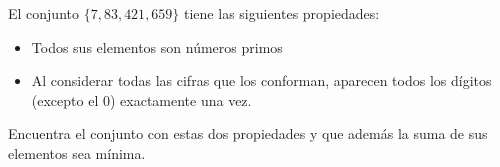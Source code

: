 El conjunto $\{7,83,421,659\}$ tiene las siguientes propiedades:
 \begin{itemize} 
 \item  Todos sus elementos son números primos 
 \item  Al considerar todas las cifras que los conforman, aparecen todos los dígitos (excepto el $0$) exactamente una vez. 
 \end{itemize} 
Encuentra el conjunto con estas dos propiedades y que además la suma de sus elementos sea mínima.